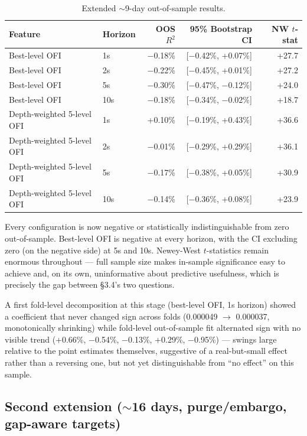 \documentclass[11pt]{article}
\begin{document}
\begin{table}[h]
\centering
\begin{tabular}{llrrr}
\toprule
Feature & Horizon & OOS $R^2$ & 95\% Bootstrap CI & NW $t$-stat \\
\midrule
Best-level OFI & 1s & $-$0.18\% & [$-$0.42\%, +0.07\%] & +27.7 \\
Best-level OFI & 2s & $-$0.22\% & [$-$0.45\%, +0.01\%] & +27.2 \\
Best-level OFI & 5s & $-$0.30\% & [$-$0.47\%, $-$0.12\%] & +24.0 \\
Best-level OFI & 10s & $-$0.18\% & [$-$0.34\%, $-$0.02\%] & +18.7 \\
Depth-weighted 5-level OFI & 1s & +0.10\% & [$-$0.19\%, +0.43\%] & +36.6 \\
Depth-weighted 5-level OFI & 2s & $-$0.01\% & [$-$0.29\%, +0.29\%] & +36.1 \\
Depth-weighted 5-level OFI & 5s & $-$0.17\% & [$-$0.38\%, +0.05\%] & +30.9 \\
Depth-weighted 5-level OFI & 10s & $-$0.14\% & [$-$0.36\%, +0.08\%] & +23.9 \\
\bottomrule
\end{tabular}
\caption{Extended $\sim$9-day out-of-sample results.}
\end{table}

Every configuration is now negative or statistically indistinguishable from zero out-of-sample. Best-level OFI is negative at every horizon, with the CI excluding zero (on the negative side) at 5s and 10s. Newey-West $t$-statistics remain enormous throughout --- full sample size makes in-sample significance easy to achieve and, on its own, uninformative about predictive usefulness, which is precisely the gap between \S3.4's two questions.

A first fold-level decomposition at this stage (best-level OFI, 1s horizon) showed a coefficient that never changed sign across folds (0.000049 $\to$ 0.000037, monotonically shrinking) while fold-level out-of-sample fit alternated sign with no visible trend (+0.66\%, $-$0.54\%, $-$0.13\%, +0.29\%, $-$0.95\%) --- swings large relative to the point estimates themselves, suggestive of a real-but-small effect rather than a reversing one, but not yet distinguishable from ``no effect'' on this sample.

\subsection{Second extension ($\sim$16 days, purge/embargo, gap-aware targets)}
\end{document}
